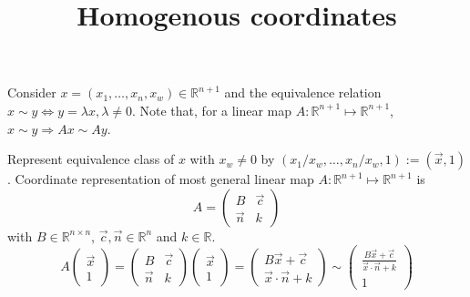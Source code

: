 \documentclass[a4paper]{article}
\title{Homogenous coordinates}
\date{}
\begin{document}
\maketitle
Consider $x = (x_1, \ldots, x_n, x_w) \in \mathds{R}^{n+1}$ and the equivalence relation $x \sim y \Leftrightarrow y = \lambda x, \lambda \neq 0$. Note that, for a linear map $A: \mathds{R}^{n+1} \mapsto \mathds{R}^{n+1}$, $x \sim y \Rightarrow Ax \sim Ay$.

Represent equivalence class of $x$ with $x_w \neq 0$ by $(x_1/x_w, \ldots, x_n/x_w, 1) := (\vec{x}, 1)$. Coordinate representation of most general linear map $A: \mathds{R}^{n+1} \mapsto \mathds{R}^{n+1}$ is
\begin{equation}
A = \left(
\begin{array}{cc}
B & \vec{c}\\
\vec{n} & k
\end{array} \right)
\end{equation}
with $B \in \mathds{R}^{n \times n}$, $\vec{c}, \vec{n} \in \mathds{R}^n$ and $k \in \mathds{R}$.
\begin{equation}
A \left( \begin{array}{c} \vec{x}\\1 \end{array} \right) =
\left(
\begin{array}{cc}
B & \vec{c}\\
\vec{n} & k
\end{array} \right)
\left( \begin{array}{c} \vec{x}\\1 \end{array} \right) =
\left( \begin{array}{c} B \vec{x} + \vec{c}\\ \vec{x} \cdot \vec{n} + k \end{array} \right)
\sim \left( \begin{array}{c}
\frac{B \vec{x} + \vec{c}}{\vec{x} \cdot \vec{n} + k}\\1
\end{array}\right)
\end{equation}
\end{document}
